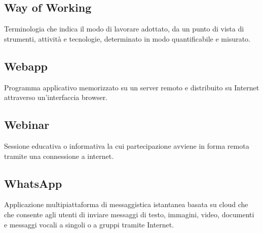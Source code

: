 \subsection{Way of Working}Terminologia che indica il modo di lavorare adottato, da un punto di vista di strumenti, attività e tecnologie, determinato in modo quantificabile e misurato.
\subsection{Webapp}Programma applicativo memorizzato su un server remoto e distribuito su Internet attraverso un'interfaccia browser.
\subsection{Webinar}Sessione educativa o informativa la cui partecipazione avviene in forma remota tramite una connessione a internet.
\subsection{WhatsApp}Applicazione multipiattaforma di messaggistica istantanea basata su cloud che che consente agli utenti di inviare messaggi di testo, immagini, video, documenti e messaggi vocali a singoli o a gruppi tramite Internet.
